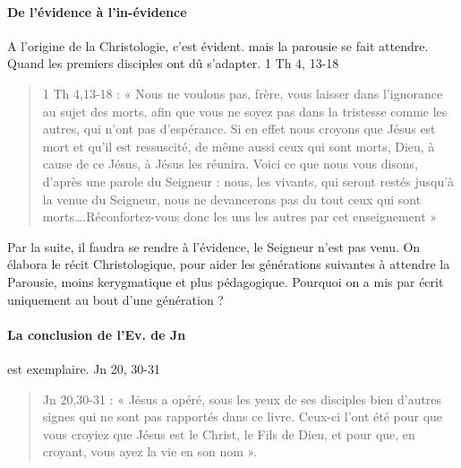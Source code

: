  \paragraph{De l'évidence à l'in-évidence} A l'origine de la Christologie, c'est évident. mais la parousie se fait attendre. Quand les premiers disciples ont dû s'adapter. 1 Th 4, 13-18 
  \begin{quote}
     1  Th  4,13-18  :  «  Nous  ne  voulons  pas,  frère,  vous  laisser  dans  l’ignorance  au  sujet  des  morts, afin  que  vous  ne  soyez  pas  dans  la  tristesse  comme  les  autres,  qui  n’ont  pas  d’espérance.  Si  en effet  nous  croyons  que  Jésus  est  mort  et  qu’il  est  ressuscité,  de  même  aussi  ceux  qui  sont morts,  Dieu,  à  cause  de  ce  Jésus,  à  Jésus  les  réunira.  Voici  ce  que  nous  vous  disons,  d’après une  parole  du  Seigneur  :  nous,  les  vivants,  qui  seront  restés  jusqu’à  la  venue  du  Seigneur, nous  ne  devancerons  pas  du  tout  ceux  qui  sont  morts….Réconfortez-vous  donc  les  uns  les autres  par cet  enseignement  »   
  \end{quote}
  Par la suite, il faudra se rendre à l'évidence, le Seigneur n'est pas venu. On élabora le récit Christologique, pour aider les générations suivantes à attendre la Parousie, moins kerygmatique et plus pédagogique. Pourquoi on a mis par écrit uniquement au bout d'une génération ?
  
  \paragraph{La conclusion de l'Ev. de Jn} est exemplaire. Jn 20, 30-31
  
  \begin{quote}
      Jn  20,30-31  :  «  Jésus  a  opéré,  sous  les  yeux  de  ses  disciples  bien  d’autres  signes  qui  ne  sont pas  rapportés  dans  ce  livre.  Ceux-ci  l’ont  été  pour  que  vous  croyiez  que  Jésus  est  le  Christ,  le Fils  de  Dieu, et  pour que, en croyant, vous  ayez  la  vie  en son nom  ». 
  \end{quote}
    
    
